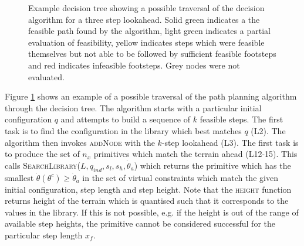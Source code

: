 \begin{figure}
	\centering
	\caption[Example decision tree showing a possible traversal of the decision algorithm]{Example decision tree showing a possible traversal of the decision algorithm for a three step lookahead. Solid green indicates a the feasible path found by the algorithm, light green indicates a partial evaluation of feasibility, yellow indicates steps which were feasible themselves but not able to be followed by sufficient feasible footsteps and red indicates infeasible footsteps. Grey nodes were not evaluated.}
	\label{fig:deciontree}
\end{figure}

Figure \ref{fig:deciontree} shows an example of a possible traversal of the path planning algorithm through the decision tree. The algorithm starts with a particular initial configuration $q$ and attempts to build a sequence of $k$ feasible steps. The first task is to find the configuration in the library which best matches $q$ (L2). The algorithm then invokes \textsc{addNode} with the $k$-step lookahead (L3). The first task is to produce the set of $n_x$ primitives which match the terrain ahead (L12-15). This calls \textsc{SearchLibrary}($L,q_{ind},s_l,s_h,\dot{\theta}_a$) which returns the primitive which has the smallest $\dot{\theta}(\theta^c) \geq \dot{\theta}_a$ in the set of virtual constraints which match the given initial configuration, step length and step height. Note that the \textsc{height} function returns height of the terrain which is quantised such that it corresponds to the values in the library. If this is not possible, e.g. if the height is out of the range of available step heights, the primitive cannot be considered successful for the particular step length $x_f$.

